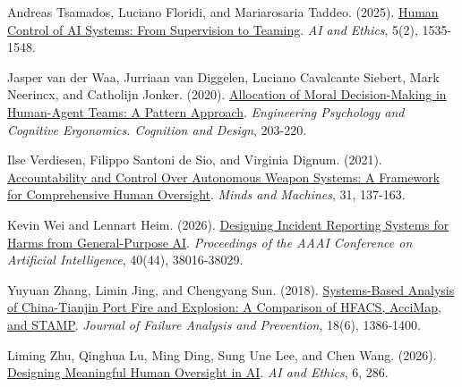 \documentclass[11pt]{article}
\newenvironment{TAEReferences}{%
  \begin{list}{}{%
    \renewcommand{\makelabel}[1]{}%
    \setlength{\labelwidth}{0pt}%
    \setlength{\labelsep}{0pt}%
    \setlength{\leftmargin}{0.5in}%
    \setlength{\itemindent}{-0.5in}%
    \setlength{\itemsep}{0.45em}%
    \setlength{\parsep}{0pt}%
    \setlength{\topsep}{0.25em}%
  }%
}{\end{list}}
\begin{document}
\begin{TAEReferences}
\item Andreas Tsamados, Luciano Floridi, and Mariarosaria Taddeo. (2025). \href{https://doi.org/10.1007/s43681-024-00489-4}{Human Control of AI Systems: From Supervision to Teaming}. \emph{AI and Ethics}, 5(2), 1535-1548.
\item Jasper van der Waa, Jurriaan van Diggelen, Luciano Cavalcante Siebert, Mark Neerincx, and Catholijn Jonker. (2020). \href{https://doi.org/10.1007/978-3-030-49183-3_16}{Allocation of Moral Decision-Making in Human-Agent Teams: A Pattern Approach}. \emph{Engineering Psychology and Cognitive Ergonomics. Cognition and Design}, 203-220.
\item Ilse Verdiesen, Filippo Santoni de Sio, and Virginia Dignum. (2021). \href{https://doi.org/10.1007/s11023-020-09532-9}{Accountability and Control Over Autonomous Weapon Systems: A Framework for Comprehensive Human Oversight}. \emph{Minds and Machines}, 31, 137-163.
\item Kevin Wei and Lennart Heim. (2026). \href{https://doi.org/10.1609/aaai.v40i44.41139}{Designing Incident Reporting Systems for Harms from General-Purpose AI}. \emph{Proceedings of the AAAI Conference on Artificial Intelligence}, 40(44), 38016-38029.
\item Yuyuan Zhang, Limin Jing, and Chengyang Sun. (2018). \href{https://doi.org/10.1007/s11668-018-0534-1}{Systems-Based Analysis of China-Tianjin Port Fire and Explosion: A Comparison of HFACS, AcciMap, and STAMP}. \emph{Journal of Failure Analysis and Prevention}, 18(6), 1386-1400.
\item Liming Zhu, Qinghua Lu, Ming Ding, Sung Une Lee, and Chen Wang. (2026). \href{https://doi.org/10.1007/s43681-026-01147-7}{Designing Meaningful Human Oversight in AI}. \emph{AI and Ethics}, 6, 286.
\end{TAEReferences}
\FloatBarrier
\end{document}
